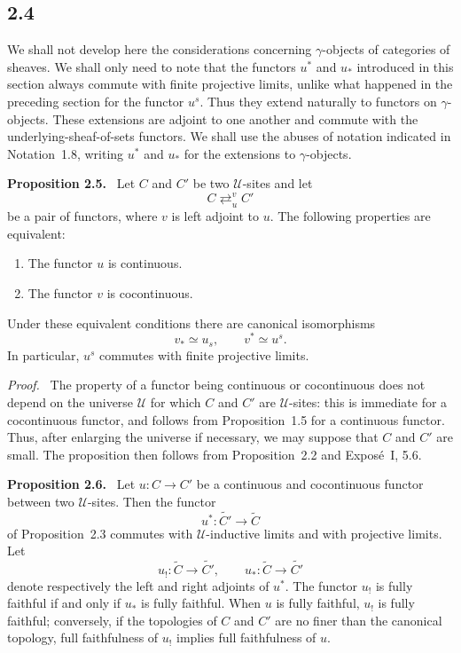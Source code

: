 \documentclass[11pt]{article}
\newcommand{\U}{\mathcal{U}}
\newenvironment{statement}[1]{\par\medskip\noindent\textbf{#1.}\ }{\par\medskip}
\newenvironment{prooftext}{\par\noindent\emph{Proof.}\ }{\par\medskip}
\begin{document}
\subsection*{2.4}
We shall not develop here the considerations concerning \(\gamma\)-objects of categories of sheaves. We shall only need to note that the functors \(u^*\) and \(u_*\) introduced in this section always commute with finite projective limits, unlike what happened in the preceding section for the functor \(u^s\). Thus they extend naturally to functors on \(\gamma\)-objects. These extensions are adjoint to one another and commute with the underlying-sheaf-of-sets functors. We shall use the abuses of notation indicated in Notation~1.8, writing \(u^*\) and \(u_*\) for the extensions to \(\gamma\)-objects.

\begin{statement}{Proposition 2.5}
Let \(C\) and \(C'\) be two \(\U\)-sites and let
\[
C\mathop{\rightleftarrows}^{v}_{u}C'
\]
be a pair of functors, where \(v\) is left adjoint to \(u\). The following properties are equivalent:
\begin{enumerate}[label=\roman*)]
\item The functor \(u\) is continuous.
\item The functor \(v\) is cocontinuous.
\end{enumerate}
Under these equivalent conditions there are canonical isomorphisms
\[
v_*\simeq u_s,
\qquad
v^*\simeq u^s.
\]
In particular, \(u^s\) commutes with finite projective limits.
\end{statement}

\begin{prooftext}
The property of a functor being continuous or cocontinuous does not depend on the universe \(\U\) for which \(C\) and \(C'\) are \(\U\)-sites: this is immediate for a cocontinuous functor, and follows from Proposition~1.5 for a continuous functor. Thus, after enlarging the universe if necessary, we may suppose that \(C\) and \(C'\) are small. The proposition then follows from Proposition~2.2 and Expos\'e~I, 5.6.
\end{prooftext}

\begin{statement}{Proposition 2.6}
Let \(u:C\to C'\) be a continuous and cocontinuous functor between two \(\U\)-sites. Then the functor
\[
u^*:\widetilde{C'}\to\widetilde C
\]
of Proposition~2.3 commutes with \(\U\)-inductive limits and with projective limits. Let
\[
u_!:\widetilde C\to\widetilde{C'},
\qquad
u_*:\widetilde C\to\widetilde{C'}
\]
denote respectively the left and right adjoints of \(u^*\). The functor \(u_!\) is fully faithful if and only if \(u_*\) is fully faithful. When \(u\) is fully faithful, \(u_!\) is fully faithful; conversely, if the topologies of \(C\) and \(C'\) are no finer than the canonical topology, full faithfulness of \(u_!\) implies full faithfulness of \(u\).
\end{statement}
\end{document}

